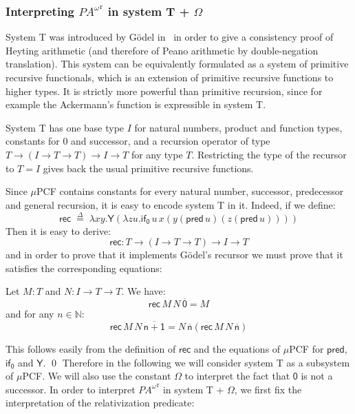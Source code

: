 \documentclass{CSML}
\newcommand*\Def{\mathrel{\overset{\Delta}{=}}}
\newcommand*\LogConst[1]{\mathsf{#1}}
\newcommand*\LogRelForm[1]{{#1^\mathrm{r}}}
\newcommand*\LmSortTo\to
\newcommand*\LmSortA{T}
\newcommand*\LmTerm[2]{#1\mathrel{:}#2}
\newcommand*\LmTermA{M}
\newcommand*\LmTermB{N}
\newcommand*\LmVarA{x}
\newcommand*\LmVarB{y}
\newcommand*\LmVarC{z}
\newcommand*\LmVarD{u}
\newcommand*\LmConst[1]{\mathsf{#1}}
\newcommand*\PA{{P\!A}}
\newcommand*\PAom{{\PA^\omega}}
\newcommand*\CALogZ{\LogConst{0}}
\newcommand*\CALmn[1]{\LmConst{\overline{#1}}}
\newcommand*\CALmnSort{I}
\newcommand*\CALmom{\LmConst{\Omega}}
\newcommand*\CALmrec{\LmConst{rec}}
\newcommand*\CALmrecSort[1]{#1\LmSortTo\left(\CALmnSort\LmSortTo#1\LmSortTo#1\right)\LmSortTo\CALmnSort\LmSortTo#1}
\newcommand*\CALmfix{\LmConst{Y}}
\newcommand*\CALmifz{\LmConst{if_0}}
\newcommand*\CALmpred{\LmConst{pred}}
\begin{document}
\subsubsection{Interpreting \texorpdfstring{$\LogRelForm{\PAom}$}{PAomegar} in system T + \texorpdfstring{$\CALmom$}{omega}}
\label{LmInterpPA}
System T was introduced by G\"odel in~\cite{GodelDialectica} in order to give a consistency proof of Heyting arithmetic (and therefore of Peano arithmetic by double-negation translation). This system can be equivalently formulated as a system of primitive recursive functionals, which is an extension of primitive recursive functions to higher types. It is strictly more powerful than primitive recursion, since for example the Ackermann's function is expressible in system T.\par
System T has one base type $\CALmnSort$ for natural numbers, product and function types, constants for $0$ and successor, and a recursion operator of type $\CALmrecSort{\LmSortA}$ for any type $\LmSortA$. Restricting the type of the recursor to $\LmSortA=\CALmnSort$ gives back the usual primitive recursive functions.\par
Since $\mu$PCF contains constants for every natural number, successor, predecessor and general recursion, it is easy to encode system T in it. Indeed, if we define:
$$\CALmrec\;\Def\;\lambda\LmVarA\LmVarB.\CALmfix\left(\lambda\LmVarC\LmVarD.\CALmifz\,\LmVarD\,\LmVarA\left(\LmVarB\left(\CALmpred\,\LmVarD\right)\left(\LmVarC\left(\CALmpred\,\LmVarD\right)\right)\right)\right)$$
Then it is easy to derive:
$$\LmTerm{\CALmrec}{\CALmrecSort{\LmSortA}}$$
and in order to prove that it implements G\"odel's recursor we must prove that it satisfies the corresponding equations:
\begin{lem}
Let $\LmTerm{\LmTermA}{\LmSortA}$ and $\LmTerm{\LmTermB}{\CALmnSort\LmSortTo\LmSortA\LmSortTo\LmSortA}$. We have:
$$\CALmrec\,\LmTermA\,\LmTermB\,\CALmn{0}=\LmTermA$$
and for any $n\in\mathbb{N}$:
$$\CALmrec\,\LmTermA\,\LmTermB\,\CALmn{n+1}=\LmTermB\,\CALmn{n}\left(\CALmrec\,\LmTermA\,\LmTermB\,\CALmn{n}\right)$$
\end{lem}
\proof
This follows easily from the definition of $\CALmrec$ and the equations of $\mu$PCF for $\CALmpred$, $\CALmifz$ and $\CALmfix$.
\qed
Therefore in the following we will consider system T as a subsystem of $\mu$PCF. We will also use the constant $\CALmom$ to interpret the fact that $\CALogZ$ is not a successor. In order to interpret $\LogRelForm{\PAom}$ in system T + $\CALmom$, we first fix the interpretation of the relativization predicate:
\end{document}
